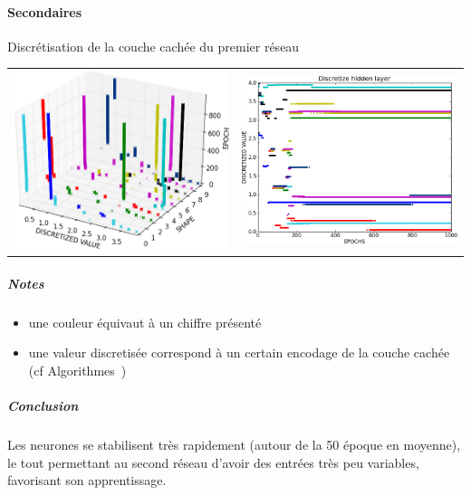     \paragraph{Secondaires}
      Discrétisation de la couche cachée du premier réseau
      \begin{center}
	\begin{tabular}{lr}
	  \hspace*{-1cm}
	  \includegraphics[width=250px]{data/expA1/discretize_cloud.png}
	  &
	  \includegraphics[width=250px]{data/expA1/discretize.png} 
	\end{tabular}
      \end{center} 
      \subparagraph{Notes}
	\begin{itemize}
	  \item une couleur équivaut à un chiffre présenté
	  \item une valeur discretisée correspond à un certain encodage de la couche cachée (cf Algorithmes~)
	\end{itemize}
      \subparagraph{Conclusion}
	Les neurones se stabilisent très rapidement (autour de la 50 époque en moyenne), 
	le tout permettant au second réseau d'avoir des entrées très peu variables, favorisant
	son apprentissage.

